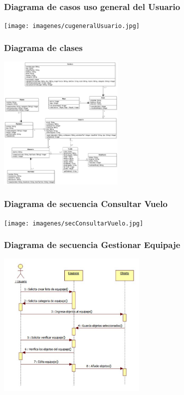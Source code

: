 \documentclass[12pt]{beamer}
\begin{document}
\begin{frame}
	\frametitle{Diagrama de casos uso general del Usuario}
	\begin{center}
		\texttt{[image: imagenes/cugeneralUsuario.jpg]}	
	\end{center}
\end{frame}


\begin{frame}
	\frametitle{Diagrama de clases}
	\begin{center}
		\includegraphics[height=6.5cm]{imagenes/diagramaClasesMovil.png}	
	\end{center}
\end{frame}


\begin{frame}
	\frametitle{Diagrama de secuencia Consultar Vuelo}
	\begin{center}
		\texttt{[image: imagenes/secConsultarVuelo.jpg]}	
	\end{center}
\end{frame}

\begin{frame}
	\frametitle{Diagrama de secuencia Gestionar Equipaje}
	\begin{center}
		\includegraphics[height=7cm]{imagenes/secGestionarEquipaje.png}	
	\end{center}
\end{frame}
\end{document}
